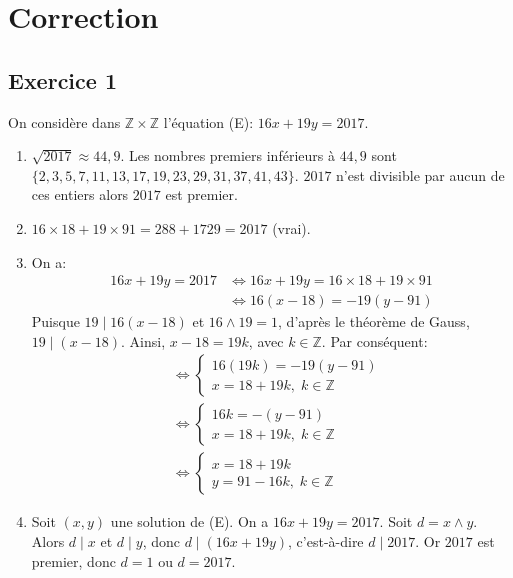 \section*{Correction}
\subsection*{Exercice 1}
On considère dans $\mathbb{Z} \times \mathbb{Z}$ l'équation (E): $16x+19y=2017$.

\begin{enumerate}
    \item $\sqrt{2017} \approx 44{,}9$.
    Les nombres premiers inférieurs à $44{,}9$ sont $\{2, 3, 5, 7, 11, 13, 17, 19, 23, 29, 31, 37, 41, 43\}$.
    $2017$ n'est divisible par aucun de ces entiers alors $2017$ est premier.

    \item $16 \times 18 + 19 \times 91 = 288 + 1729 = 2017$ (vrai).

    \item On a:
    \begin{align*} 16x+19y=2017 &\iff 16x+19y=16 \times 18+19 \times 91 \\ &\iff 16(x-18)=-19(y-91) \end{align*}
    Puisque $19 \mid 16(x-18)$ et $16 \wedge 19 = 1$, d'après le théorème de Gauss, $19 \mid (x-18)$.
    Ainsi, $x-18=19k$, avec $k \in \mathbb{Z}$.
    Par conséquent:
    \begin{align*}
    &\iff \begin{cases} 16(19k)=-19(y-91) \\ x=18+19k,\; k \in \mathbb{Z} \end{cases} \\
    &\iff \begin{cases} 16k=-(y-91) \\ x=18+19k,\; k \in \mathbb{Z} \end{cases} \\
    &\iff \begin{cases} x=18+19k \\ y=91-16k,\; k \in \mathbb{Z} \end{cases}
    \end{align*}

    \item Soit $(x,y)$ une solution de (E). On a $16x+19y=2017$.
    Soit $d = x \wedge y$. Alors $d \mid x$ et $d \mid y$, donc $d \mid (16x+19y)$, c'est-à-dire $d \mid 2017$.
    Or $2017$ est premier, donc $d = 1$ ou $d = 2017$.


\end{enumerate}
